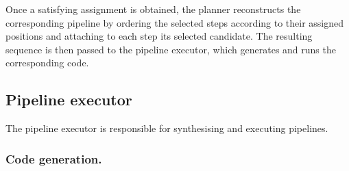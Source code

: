 \documentclass[runningheads]{llncs}
\begin{document}
Once a satisfying assignment is obtained,
the planner reconstructs the corresponding pipeline by ordering the selected steps according to their assigned positions
and attaching to each step its selected candidate.
%
The resulting sequence is then passed to the pipeline executor,
which generates and runs the corresponding code.



\subsection{Pipeline executor}
\label{subsec:pipeline-execution}
The pipeline executor is responsible for synthesising and executing pipelines.

\subsubsection{Code generation.}
\end{document}
